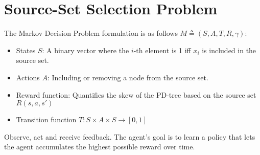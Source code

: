 \documentclass[a4paper]{extarticle}
\begin{document}
\newcommand{\abs}[1]{\vert #1\vert}
\newcommand{\norm}[1]{\vert\vert #1\vert\vert}
\newcommand{\floor}[1]{\lfloor #1\rfloor}
\newcommand{\ceil}[1]{\lceil #1\rceil}

\section{Source-Set Selection Problem}

The Markov Decision Problem formulation is as follows $M \triangleq (S, A, T, R, \gamma)$:
\begin{itemize}
  \item States $S$: A binary vector where the $i$-th element is 1 iff $x_i$ is included in the source set.
  \item Actions $A$: Including or removing a node from the source set.
  \item Reward function: Quantifies the skew of the PD-tree based on the source set $R(s, a, s')$
  \item Transition function $T: S \times A \times S \rightarrow [0, 1]$
\end{itemize}

Observe, act and receive feedback. The agent's goal is to learn a policy that lets the agent accumulates the highest possible reward over time.
\end{document}

